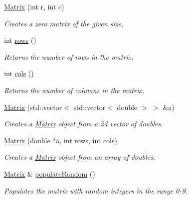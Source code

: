 \begin{DoxyCompactItemize}
\item 
\hyperlink{class_matrix_a07a3cee5bc286ca27ceffe81ce5a2d01}{Matrix} (int r, int c)
\begin{DoxyCompactList}\small\item\em Creates a zero matrix of the given size. \item\end{DoxyCompactList}\item 
int \hyperlink{class_matrix_add9c23e5ff5e2456a8d48024ab19fe96}{rows} ()
\begin{DoxyCompactList}\small\item\em Returns the number of rows in the matrix. \item\end{DoxyCompactList}\item 
int \hyperlink{class_matrix_a35649f43610688d020b2cad91f616d51}{cols} ()
\begin{DoxyCompactList}\small\item\em Returns the number of columns in the matrix. \item\end{DoxyCompactList}\item 
\hyperlink{class_matrix_a0db283ef4ea2660f8d0c1b58f9e74f49}{Matrix} (std::vector$<$ std::vector$<$ double $>$ $>$ \&a)
\begin{DoxyCompactList}\small\item\em Creates a \hyperlink{class_matrix}{Matrix} object from a 2d vector of doubles. \item\end{DoxyCompactList}\item 
\hyperlink{class_matrix_a3179cefb929e09cbdc95d143e1d9e3d2}{Matrix} (double $\ast$a, int rows, int cols)
\begin{DoxyCompactList}\small\item\em Creates a \hyperlink{class_matrix}{Matrix} object from an array of doubles. \item\end{DoxyCompactList}\item 
\hyperlink{class_matrix}{Matrix} \& \hyperlink{class_matrix_a375fc575a7e042d0eed3d76c7470e59f}{populateRandom} ()
\begin{DoxyCompactList}\small\item\em Populates the matrix with random integers in the range 0-\/9. \item\end{DoxyCompactList}\item 

\end{DoxyCompactItemize}
